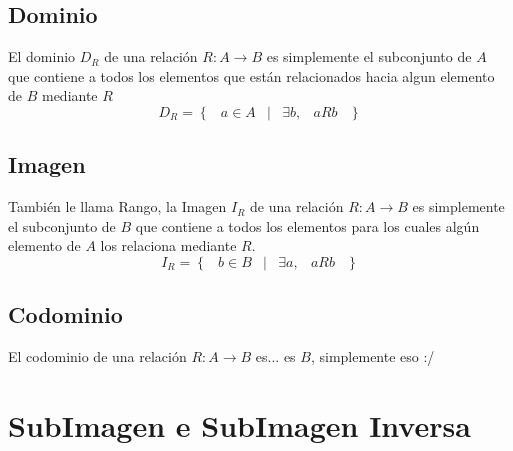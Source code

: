 \documentclass[12pt, fleqn]{report}                             %
\DeclareMathOperator \Space {\quad}                             %
\DeclareMathOperator \MiniSpace {\;}                            %
\newcommand \Such {\MiniSpace|\MiniSpace}                       %
\newcommand{\Set}[1]{\left\{ \MiniSpace #1 \MiniSpace \right\}} %
\begin{document}
            \subsection*{Dominio}

                El dominio $D_R$ de una relación $R : A \to B$ es simplemente el subconjunto de $A$ que
                contiene a todos los elementos que están relacionados hacia algun elemento de $B$ mediante $R$
                \begin{equation*}
                    D_R = \Set{ a \in A \Such \exists b, \MiniSpace aRb }
                \end{equation*}

            \subsection*{Imagen}

                También le llama Rango, la Imagen $I_R$ de una relación $R : A \to B$
                es simplemente el subconjunto de $B$ que contiene a todos los elementos
                para los cuales algún elemento de $A$ los relaciona mediante $R$.
                \begin{equation*}
                    I_R = \Set{ b \in B \Such \exists a, \MiniSpace aRb }
                \end{equation*}

            \subsection*{Codominio}

                El codominio de una relación $R: A \to B$ es... es $B$, simplemente eso :/


        \clearpage
        \section{SubImagen e SubImagen Inversa}
\end{document}
